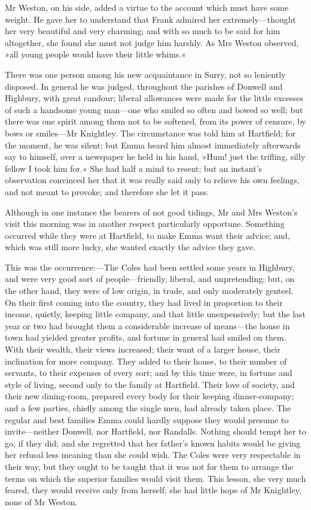 Mr Weston, on his side, added a virtue to the account which must have some weight. He gave her to understand that Frank admired her extremely—thought her very beautiful and very charming; and with so much to be said for him altogether, she found she must not judge him harshly. As Mrs Weston observed, »all young people would have their little whims.«

There was one person among his new acquaintance in Surry, not so leniently disposed. In general he was judged, throughout the parishes of Donwell and Highbury, with great candour; liberal allowances were made for the little excesses of such a handsome young man—one who smiled so often and bowed so well; but there was one spirit among them not to be softened, from its power of censure, by bows or smiles—Mr Knightley. The circumstance was told him at Hartfield; for the moment, he was silent; but Emma heard him almost immediately afterwards say to himself, over a newspaper he held in his hand, »Hum! just the trifling, silly fellow I took him for.« She had half a mind to resent; but an instant's observation convinced her that it was really said only to relieve his own feelings, and not meant to provoke; and therefore she let it pass.

Although in one instance the bearers of not good tidings, Mr and Mrs Weston's visit this morning was in another respect particularly opportune. Something occurred while they were at Hartfield, to make Emma want their advice; and, which was still more lucky, she wanted exactly the advice they gave.

This was the occurrence:—The Coles had been settled some years in Highbury, and were very good sort of people—friendly, liberal, and unpretending; but, on the other hand, they were of low origin, in trade, and only moderately genteel. On their first coming into the country, they had lived in proportion to their income, quietly, keeping little company, and that little unexpensively; but the last year or two had brought them a considerable increase of means—the house in town had yielded greater profits, and fortune in general had smiled on them. With their wealth, their views increased; their want of a larger house, their inclination for more company. They added to their house, to their number of servants, to their expenses of every sort; and by this time were, in fortune and style of living, second only to the family at Hartfield. Their love of society, and their new dining-room, prepared every body for their keeping dinner-company; and a few parties, chiefly among the single men, had already taken place. The regular and best families Emma could hardly suppose they would presume to invite—neither Donwell, nor Hartfield, nor Randalls. Nothing should tempt her to go, if they did; and she regretted that her father's known habits would be giving her refusal less meaning than she could wish. The Coles were very respectable in their way, but they ought to be taught that it was not for them to arrange the terms on which the superior families would visit them. This lesson, she very much feared, they would receive only from herself; she had little hope of Mr Knightley, none of Mr Weston.

